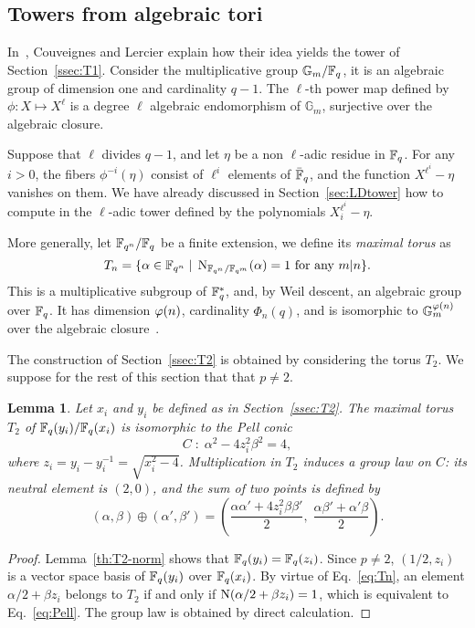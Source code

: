\documentclass{sig-alternate}
\newtheorem{lemma}[definition]{Lemma}
\begin{document}
\subsection{Towers from algebraic tori}

In~\cite{couveignes+lercier11}, Couveignes and Lercier explain how
their idea yields the tower of Section~\ref{ssec:T1}. Consider the
multiplicative group $\mathbb{G}_m/\mathbb{F}_q$, it is an algebraic group of
dimension one and cardinality $q-1$.  The $\ell$-th power map defined
by $\phi:X\mapsto X^\ell$ is a degree $\ell$ algebraic endomorphism of
$\mathbb{G}_m$, surjective over the algebraic closure.

Suppose that $\ell$ divides $q-1$, and let $\eta$ be a non $\ell$-adic
residue in $\mathbb{F}_q$. For any $i>0$, the fibers $\phi^{-i}(\eta)$ consist
of $\ell^i$ elements of $\bar{\mathbb{F}}_q$, and the function
$X^{\ell^i}-\eta$ vanishes on them. We have already discussed in
Section~\ref{sec:LDtower} how to compute in the $\ell$-adic tower
defined by the polynomials $X_i^{\ell^i}-\eta$.

More generally, let $\mathbb{F}_{q^n}/\mathbb{F}_q$ be a finite extension, we define
its \emph{maximal torus} as
\begin{equation}
  \label{eq:Tn}
  T_n = \{\alpha\in\mathbb{F}_{q^n} \;|\; \operatorname{N}_{\mathbb{F}_{q^n}/\mathbb{F}_{q^m}}(\alpha) = 1 
  \text{ for any $m|n$} \}.
\end{equation}
This is a multiplicative subgroup of $\mathbb{F}_q^\ast$, and, by Weil
descent, an algebraic group over $\mathbb{F}_q$. It has dimension $\varphi(n)$,
cardinality $\Phi_n(q)$, and is isomorphic to
$\mathbb{G}_m^{\varphi(n)}$ over the algebraic
closure~\cite{rubin-silverberg+crypto03,rubin+silverberg03,voskresenskii98}.

The construction of Section~\ref{ssec:T2} is obtained by considering
the torus $T_2$. We suppose for the rest of this section that that
$p\ne2$.

\begin{lemma}
  Let $x_i$ and $y_i$ be defined as in Section~\ref{ssec:T2}. The
  maximal torus $T_2$ of $\mathbb{F}_q(y_i)/\mathbb{F}_q(x_i)$ is isomorphic to the
  \emph{Pell conic}
  \begin{equation}
    \label{eq:Pell}
    C \;:\; \alpha^2 - 4z_i^2\beta^2 = 4,
  \end{equation}
  where $z_i = y_i - y_i^{-1}=\sqrt{x_i^2-4}$. Multiplication in $T_2$
  induces a group law on $C$: its neutral element is $(2,0)$, and the
  sum of two points is defined by
  \begin{equation}
    \label{eq:Pell-add}
    (\alpha,\beta)\oplus(\alpha',\beta') =
    \left(\frac{\alpha\alpha' + 4z_i^2\beta\beta'}{2},\; \frac{\alpha\beta' + \alpha'\beta}{2}\right).
  \end{equation}
\end{lemma}
\begin{proof}
  Lemma~\ref{th:T2-norm} shows that $\mathbb{F}_q(y_i)=\mathbb{F}_q(z_i)$. Since
  $p\ne2$, $(1/2, z_i)$ is a vector space basis of $\mathbb{F}_q(y_i)$ over
  $\mathbb{F}_q(x_i)$.  By virtue of Eq.~\eqref{eq:Tn}, an element
  $\alpha/2+\beta z_i$ belongs to $T_2$ if and only if
  $\operatorname{N}(\alpha/2+\beta z_i)=1$, which is equivalent to
  Eq.~\eqref{eq:Pell}.  The group law is obtained by direct
  calculation.
\end{proof}
\end{document}
